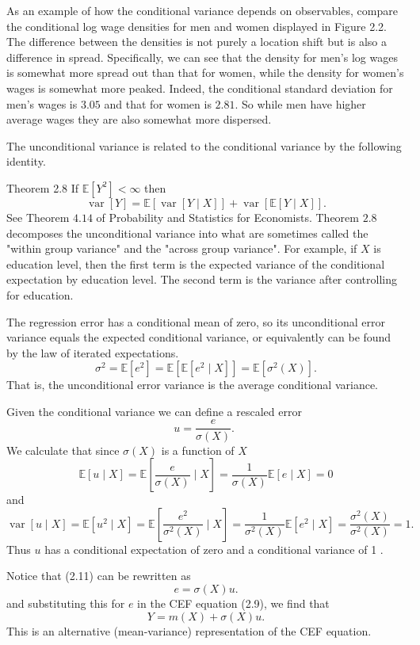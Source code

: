 \documentclass[10pt]{article}
\begin{document}
As an example of how the conditional variance depends on observables, compare the conditional log wage densities for men and women displayed in Figure 2.2. The difference between the densities is not purely a location shift but is also a difference in spread. Specifically, we can see that the density for men's log wages is somewhat more spread out than that for women, while the density for women's wages is somewhat more peaked. Indeed, the conditional standard deviation for men's wages is $3.05$ and that for women is $2.81$. So while men have higher average wages they are also somewhat more dispersed.

The unconditional variance is related to the conditional variance by the following identity.

Theorem 2.8 If $\mathbb{E}\left[Y^{2}\right]<\infty$ then
$$
\operatorname{var}[Y]=\mathbb{E}[\operatorname{var}[Y \mid X]]+\operatorname{var}[\mathbb{E}[Y \mid X]] .
$$
See Theorem $4.14$ of Probability and Statistics for Economists. Theorem $2.8$ decomposes the unconditional variance into what are sometimes called the "within group variance" and the "across group variance". For example, if $X$ is education level, then the first term is the expected variance of the conditional expectation by education level. The second term is the variance after controlling for education.

The regression error has a conditional mean of zero, so its unconditional error variance equals the expected conditional variance, or equivalently can be found by the law of iterated expectations.
$$
\sigma^{2}=\mathbb{E}\left[e^{2}\right]=\mathbb{E}\left[\mathbb{E}\left[e^{2} \mid X\right]\right]=\mathbb{E}\left[\sigma^{2}(X)\right] .
$$
That is, the unconditional error variance is the average conditional variance.

Given the conditional variance we can define a rescaled error
$$
u=\frac{e}{\sigma(X)} \text {. }
$$
We calculate that since $\sigma(X)$ is a function of $X$
$$
\mathbb{E}[u \mid X]=\mathbb{E}\left[\frac{e}{\sigma(X)} \mid X\right]=\frac{1}{\sigma(X)} \mathbb{E}[e \mid X]=0
$$
and
$$
\operatorname{var}[u \mid X]=\mathbb{E}\left[u^{2} \mid X\right]=\mathbb{E}\left[\frac{e^{2}}{\sigma^{2}(X)} \mid X\right]=\frac{1}{\sigma^{2}(X)} \mathbb{E}\left[e^{2} \mid X\right]=\frac{\sigma^{2}(X)}{\sigma^{2}(X)}=1 .
$$
Thus $u$ has a conditional expectation of zero and a conditional variance of 1 .

Notice that (2.11) can be rewritten as
$$
e=\sigma(X) u .
$$
and substituting this for $e$ in the CEF equation (2.9), we find that
$$
Y=m(X)+\sigma(X) u .
$$
This is an alternative (mean-variance) representation of the CEF equation.
\end{document}
